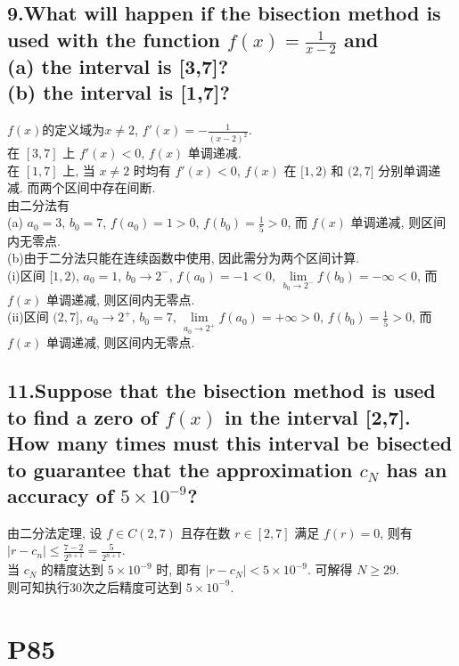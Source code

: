 \documentclass{ctexart}
\begin{document}
\begin{flushleft}
    \subsection*{9.What will happen if the bisection method is used with the function $f(x)=\frac{1}{x-2}$ and \\
    (a) the interval is [3,7]? \\ (b) the interval is [1,7]?}
    $f(x)$的定义域为$x\neq2$, $\displaystyle f'(x)=-\frac{1}{(x-2)^2}$. \\
    在 $[3,7]$ 上 $f'(x)<0$, $f(x)$ 单调递减. \\
    在 $[1,7]$ 上, 当 $x\neq2$ 时均有 $f'(x)<0$, $f(x)$ 在 $[1,2)$ 和 $(2,7]$ 分别单调递减. 而两个区间中存在间断. \\
    由二分法有 \\
    \qquad(a) $a_0=3$, $b_0=7$, $f(a_0)=1>0$, $f(b_0)=\frac{1}{5}>0$, 而 $f(x)$ 单调递减, 则区间内无零点. \\
    \qquad(b)由于二分法只能在连续函数中使用, 因此需分为两个区间计算. \\
    \qquad\qquad(i)区间 $[1,2)$, $a_0=1$, $b_0\rightarrow2^-$, $f(a_0)=-1<0$, $\lim\limits_{b_0\rightarrow2^-}f(b_0)=-\infty<0$, 而 $f(x)$ 单调递减, 则区间内无零点. \\
    \qquad\qquad(ii)区间 $(2,7]$, $a_0\rightarrow2^+$, $b_0=7$, $\lim\limits_{a_0\rightarrow2^+}f(a_0)=+\infty>0$, $f(b_0)=\frac{1}{5}>0$, 而 $f(x)$ 单调递减, 则区间内无零点.

    \subsection*{11.Suppose that the bisection method is used to find a zero of $f(x)$ in the interval [2,7]. How many times must this interval be bisected to guarantee that the approximation $c_N$ has an accuracy of $5\times 10^{-9}$?}
    由二分法定理, 设 $f\in C(2,7)$ 且存在数 $r\in[2,7]$ 满足 $f(r)=0$, 则有 $\displaystyle|r-c_n|\leq\frac{7-2}{2^{n+1}}=\frac{5}{2^{n+1}}$. \\
    当 $c_N$ 的精度达到 $5\times10^{-9}$ 时, 即有 $|r-c_N|<5\times10^{-9}$. 可解得 $N\geq29 $. \\
    则可知执行30次之后精度可达到 $5\times10^{-9}$.


    \section*{P85}

\end{flushleft}
\end{document}
